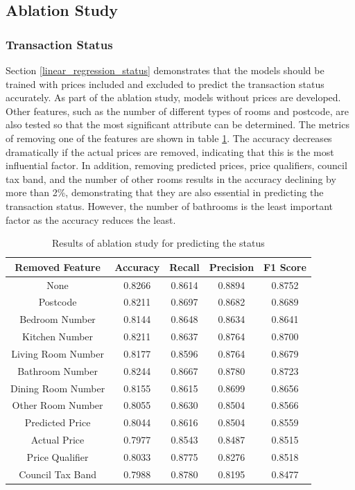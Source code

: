 \documentclass[12pt,twoside]{report}
\begin{document}
\subsection{Ablation Study}
\subsubsection{Transaction Status}
Section \ref{linear_regression_status} demonstrates that the models should be trained with prices included and excluded to predict the transaction status accurately. As part of the ablation study, models without prices are developed. Other features, such as the number of different types of rooms and postcode, are also tested so that the most significant attribute can be determined. The metrics of removing one of the features are shown in table \ref{ablation_status}. The accuracy decreases dramatically if the actual prices are removed, indicating that this is the most influential factor. In addition, removing predicted prices, price qualifiers, council tax band, and the number of other rooms results in the accuracy declining by more than 2\%, demonstrating that they are also essential in predicting the transaction status. However, the number of bathrooms is the least important factor as the accuracy reduces the least.

\begin{table}[H]
	\centering
	\caption{Results of ablation study for predicting the status}
	\label{ablation_status}
	\begin{tabular}{| c | c | c | c | c | }
		\hline
		Removed Feature & Accuracy & Recall & Precision & F1 Score \\
		\hline
		None & 0.8266 & 0.8614 & 0.8894 & 0.8752 \\
		\hline
		Postcode & 0.8211 & 0.8697 & 0.8682 & 0.8689 \\
		\hline
		Bedroom Number & 0.8144 & 0.8648 & 0.8634 & 0.8641 \\
		\hline
		Kitchen Number & 0.8211 & 0.8637 & 0.8764 & 0.8700 \\
		\hline
		Living Room Number & 0.8177 & 0.8596 & 0.8764 & 0.8679 \\
		\hline
		Bathroom Number & 0.8244 & 0.8667 & 0.8780 & 0.8723 \\
		\hline
		Dining Room Number & 0.8155 & 0.8615 & 0.8699 & 0.8656 \\
		\hline
		Other Room Number & 0.8055 & 0.8630 & 0.8504 & 0.8566 \\
		\hline
		Predicted Price & 0.8044 & 0.8616 & 0.8504 & 0.8559 \\
		\hline
		Actual Price & 0.7977 & 0.8543 & 0.8487 & 0.8515 \\
		\hline
		Price Qualifier & 0.8033 & 0.8775 & 0.8276 & 0.8518 \\
		\hline
		Council Tax Band & 0.7988 & 0.8780 & 0.8195 & 0.8477 \\
		\hline
	\end{tabular}
\end{table}
\end{document}
